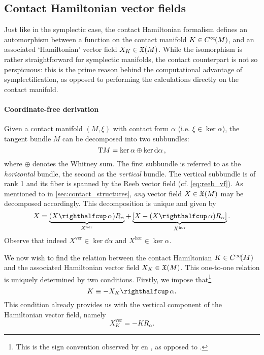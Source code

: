 \subsection{Contact Hamiltonian vector fields}
\label{ssec:contact_ham_vfields}
Just like in the symplectic case, the contact Hamiltonian formalism defines an automorphism between a function on the contact manifold $K \in C^\infty\!\qty(M)$, and an associated `Hamiltonian' vector field $X_K \in \mathfrak{X}\qty(M)$. While the isomorphism is rather straightforward for symplectic manifolds, the contact counterpart is not so perspicuous: this is the prime reason behind the computational advantage of symplectification, as opposed to performing the calculations directly on the contact manifold.
\paragraph{Coordinate-free derivation} Given a contact manifold $(M, \xi)$ with contact form $\alpha$ (i.e. $\xi \in \ker \alpha$), the tangent bundle $M$ can be decomposed into two subbundles: \cite{Libermann1987,Cannas2001}
$$ \mathrm{T}M = \ker \alpha \oplus \ker \dd{\alpha}, $$
where $\oplus$ denotes the Whitney sum. The first subbundle is referred to as the \emph{horizontal} bundle, the second as the \emph{vertical}
 bundle. The vertical subbundle is of rank 1 and its fiber is spanned by the Reeb vector field (cf. \cref{eq:reeb_vf}). As mentioned to in \cref{sec:contact_structures}, \emph{any} vector field $X \in \mathfrak{X}\qty(M)$ may be decomposed accordingly. This decomposition is unique and given by
\begin{equation}
    X = \underbrace{(\intpr{X}{\alpha})R_\alpha}_{X^\text{ver}} + \underbrace{\qty[X - (\intpr{X}{\alpha})R_\alpha]}_{X^\text{hor}}.
    \label{eq:contact_vf_decomp}
\end{equation}
Observe that indeed $X^\text{ver} \in \ker \dd{\alpha}$ and $X^\text{hor} \in \ker \alpha$. \cite{Cannas2001,DeLeon2020,Libermann1987}

We now wish to find the relation between the contact Hamiltonian $K \in C^\infty\!\qty(M)$ and the associated Hamiltonian vector field $X_K \in \mathfrak{X}\qty(M)$. This one-to-one relation is uniquely determined by two conditions. Firstly, we impose that\footnote{This is the sign convention observed by \citet{Bravetti2017} en \citet{VanderSchaft2021a}, as opposed to \citet{Libermann1987}.}
    $$ K \equiv -\intpr{X_K}{\alpha}. $$
This condition already provides us with the vertical component of the Hamiltonian vector field, namely
$$ X_K^\text{ver} = -K R_\alpha. $$

